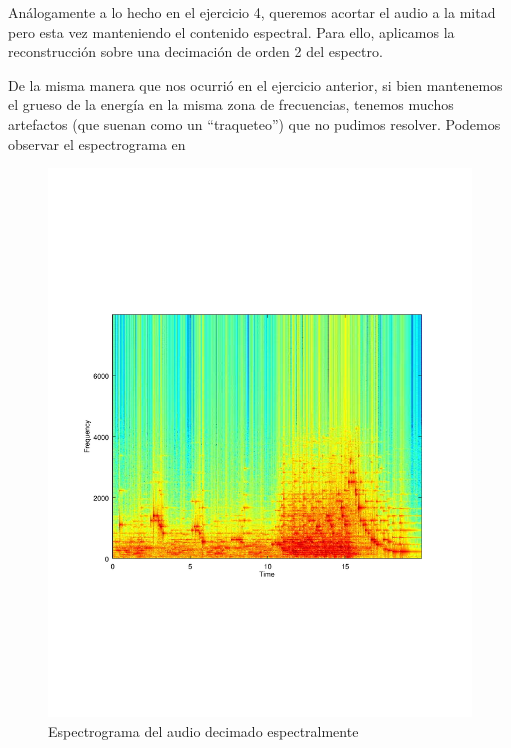 \documentclass[paper=a4, fontsize=11pt]{scrartcl} %
\numberwithin{equation}{section} %
\numberwithin{figure}{section} %
\numberwithin{table}{section} %
\begin{document}
Análogamente a lo hecho en el ejercicio 4, queremos acortar el audio a la mitad pero esta vez manteniendo el contenido espectral. Para ello, aplicamos la reconstrucción sobre una decimación de orden 2 del espectro.

De la misma manera que nos ocurrió en el ejercicio anterior, si bien mantenemos el grueso de la energía en la misma zona de frecuencias, tenemos muchos artefactos (que suenan como un ``traqueteo'') que no pudimos resolver. Podemos observar el espectrograma en

\begin{figure}[b!]
\includegraphics[width=\textwidth]{../images/specgram_7_decimated.pdf}
\caption{Espectrograma del audio decimado espectralmente}
\label{audio_decimado_espectralmente}
\end{figure}
\end{document}
